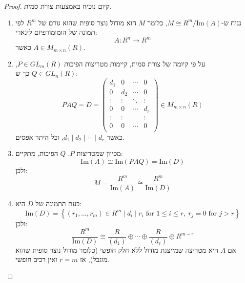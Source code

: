 \documentclass{tstextbook}
\begin{document}
\begin{proof}
קיום
נוכיח באמצעות צורת סמית. 

  \begin{enumerate}
    \item נניח ש-\(M \cong R^m / \mathrm{Im}(A)\), כלומר \(M\) הוא מודול נוצר סופית שהוא גורם של \(R^m\) לפי תמונה של הומומורפיזם לינארי: 
$$A : R^n \to R^m
$$
כאשר \(A \in M_{m \times n}(R)\).


    \item על פי קיומה של צורת סמית, קיימות מטריצות הפיכות \(P \in GL_m(R)\), \(Q \in GL_n(R)\) כך ש: 
$$PAQ = D =\begin{pmatrix}d_1 & 0 & \cdots & 0 \\0 & d_2 & \cdots & 0 \\\vdots & \vdots & \ddots & \vdots \\0 & 0 & \cdots & d_r \\\vdots & \vdots & & \vdots \\0 & 0 & \cdots & 0 \\\end{pmatrix}
\in M_{m \times n}(R)$$
כאשר \(d_1 \mid d_2 \mid \cdots \mid d_r\), וכל היתר אפסים.


    \item מכיוון שמטריצות \(P\), \(Q\) הפיכות, מתקיים: 
$$\mathrm{Im}(A) \cong \mathrm{Im}(PAQ) = \mathrm{Im}(D)$$
ולכן:
$$M = \frac{R^m}{\mathrm{Im}(A)} \cong \frac{R^m}{\mathrm{Im}(D)}$$


    \item כעת התמונה של \(D\) היא: 
$$\mathrm{Im}(D) = \left\{ (r_1, \dots, r_m) \in R^m \mid d_i \mid r_i \text{ for } 1 \leq i \leq r, \; r_j = 0 \text{ for } j > r \right\}
$$
ולכן:
$$\frac{R^m}{\mathrm{Im}(D)} \cong \frac{R}{(d_1)} \oplus \cdots \oplus \frac{R}{(d_r)} \oplus R^{m - r}
$$
אם \(A\) היא מטריצה שמייצגת מודול ללא חלק חופשי (כלומר מודול נוצר סופית שהוא מוגבל), אז \(r = m\) ואין רכיב חופשי.


  \end{enumerate}
\end{proof}
\end{document}
